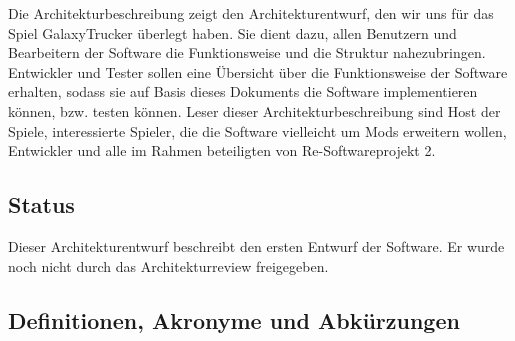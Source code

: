 \documentclass[fontsize=12pt,paper=a4,twoside]{scrartcl}
\begin{document}
Die Architekturbeschreibung zeigt den Architekturentwurf, den wir uns für das Spiel GalaxyTrucker überlegt haben. Sie dient dazu, allen Benutzern und Bearbeitern der Software die Funktionsweise und die Struktur nahezubringen. Entwickler und Tester sollen eine Übersicht über die Funktionsweise der Software erhalten, sodass sie auf Basis dieses Dokuments die Software implementieren können, bzw. testen können. 
Leser dieser Architekturbeschreibung sind Host der Spiele, interessierte Spieler, die die Software vielleicht um Mods erweitern wollen, Entwickler und alle im Rahmen beteiligten von Re-Softwareprojekt 2. 

\subsection{Status}

Dieser Architekturentwurf beschreibt den ersten Entwurf der Software. Er wurde noch nicht durch das Architekturreview freigegeben. 
  
\subsection{Definitionen, Akronyme und Abkürzungen}
\end{document}
